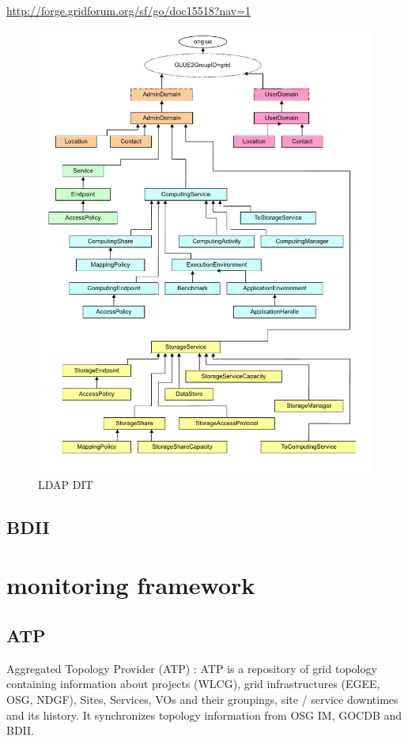 \url{http://forge.gridforum.org/sf/go/doc15518?nav=1}

\begin{figure}[htb]
\centering
 \includegraphics[width=6in]{images/glue2}
\caption{LDAP DIT}
\label{figure:gluedit}
\end{figure}

\subsection{BDII}




\section{monitoring framework}

\subsection{ATP}
Aggregated Topology Provider (ATP) : ATP is a repository of grid topology
containing information about projects (WLCG), grid infrastructures (EGEE, OSG,
NDGF), Sites, Services, VOs and their groupings, site / service downtimes and
its history. It synchronizes topology information from OSG IM, GOCDB and BDII.


